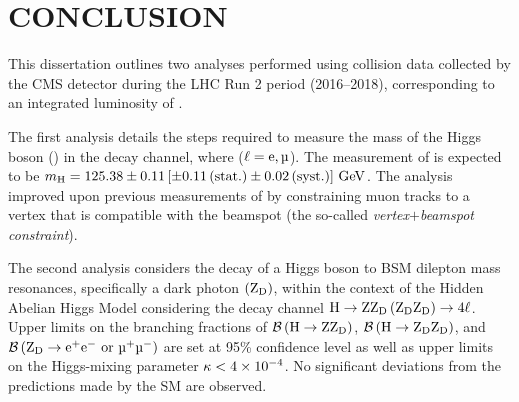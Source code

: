 \chapter{CONCLUSION}
\label{ch:conclusion}
This dissertation outlines two analyses performed using \pp collision data collected by the CMS detector during the LHC Run 2 period (2016--2018), corresponding to an integrated luminosity of \lumiruntwo.

The first analysis details the steps required to measure the mass of the Higgs boson (\mH) in the \hzzfourl decay channel, where ($\ell = \Pe, \Pmu$).
The measurement of \mH is expected to be $m_{\mathrm{H}} = 125.38 \pm 0.11 \left[\pm 0.11 \,\text{(stat.)} \pm 0.02\,\text{(syst.)} \right] \,\text{Ge\hspace{-.08em}V}$.  %
The analysis improved upon previous measurements of \mH by constraining muon tracks to a vertex that is compatible with the beamspot (the so-called \emph{vertex$+$beamspot constraint}).

The second analysis considers the decay of a Higgs boson to BSM dilepton mass resonances, specifically a dark photon $\left( \mathrm{Z}_\text{D} \right)$, within the context of the Hidden Abelian Higgs Model considering the decay channel $\mathrm{H} \to \mathrm{Z} \mathrm{Z}_\text{D} \left( \mathrm{Z}_\text{D} \mathrm{Z}_\text{D} \right) \to 4\ell$.
Upper limits on the branching fractions of $\mathcal{B} \left( \mathrm{H} \to \mathrm{Z} \mathrm{Z}_\text{D} \right)$, $\mathcal{B} \left( \mathrm{H} \to \mathrm{Z}_\text{D} \mathrm{Z}_\text{D} \right)$, and $\brof{\zdtoeepmormumupm}$ are set at 95\% confidence level as well as upper limits on the Higgs-mixing parameter $\kappa < 4\times \text{10}^\text{$-$4}$.
No significant deviations from the predictions made by the SM are observed.